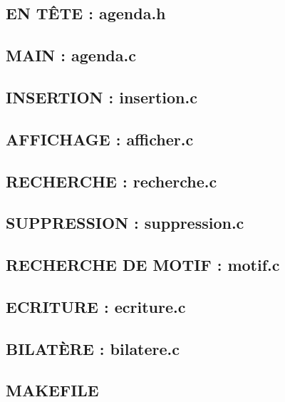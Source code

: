 \documentclass{report}
\begin{document}
\subsection{EN TÊTE : agenda.h}
\begin{small}


\newpage
\subsection{MAIN : agenda.c}


\subsection{INSERTION : insertion.c}


\subsection{AFFICHAGE : afficher.c}


\subsection{RECHERCHE : recherche.c}


\subsection{SUPPRESSION : suppression.c}


\subsection{RECHERCHE DE MOTIF : motif.c}


\subsection{ECRITURE : ecriture.c}


\subsection{BILATÈRE : bilatere.c}


\newpage
\subsection{MAKEFILE}

\end{small}
\end{document}

